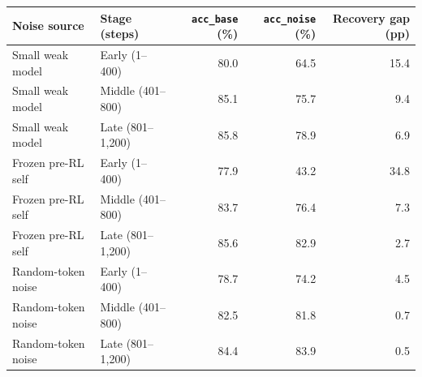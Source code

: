 \begin{minipage}{\TableWidth}
\centering
\small
\begin{tabular*}{\linewidth}{@{\extracolsep{\fill}}llrrr@{}}
\toprule
Noise source & Stage (steps) & \texttt{acc\_base} (\%) & \texttt{acc\_noise} (\%) & Recovery gap (pp) \\
\midrule
Small weak model   & Early (1--400)     & 80.0 & 64.5 & 15.4 \\
Small weak model   & Middle (401--800)  & 85.1 & 75.7 &  9.4 \\
Small weak model   & Late (801--1,200)  & 85.8 & 78.9 &  6.9 \\
\addlinespace
Frozen pre-RL self & Early (1--400)     & 77.9 & 43.2 & 34.8 \\
Frozen pre-RL self & Middle (401--800)  & 83.7 & 76.4 &  7.3 \\
Frozen pre-RL self & Late (801--1,200)  & 85.6 & 82.9 &  2.7 \\
\addlinespace
Random-token noise & Early (1--400)     & 78.7 & 74.2 &  4.5 \\
Random-token noise & Middle (401--800)  & 82.5 & 81.8 &  0.7 \\
Random-token noise & Late (801--1,200)  & 84.4 & 83.9 &  0.5 \\
\bottomrule
\end{tabular*}
\end{minipage}
